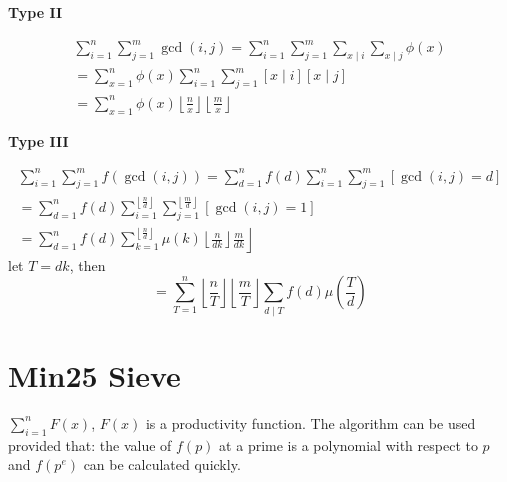 \textbf{Type II}
\begin{small}
\begin{equation}
	\begin{gathered}
	\sum_{i=1}^n \sum_{j=1}^m \operatorname{gcd}(i, j)=\sum_{i=1}^n \sum_{j=1}^m \sum_{x \mid i} \sum_{x \mid j} \phi(x) \\
	=\sum_{x=1}^n \phi(x) \sum_{i=1}^n \sum_{j=1}^m[x \mid i][x \mid j] \\
	=\sum_{x=1}^n \phi(x)\left\lfloor\frac{n}{x}\right\rfloor\left\lfloor\frac{m}{x}\right\rfloor
	\end{gathered}
	\end{equation}
\end{small}

\textbf{Type III}
\begin{small}
\begin{equation}
	\begin{gathered}
	\sum_{i=1}^n \sum_{j=1}^m f(\operatorname{gcd}(i, j))=\sum_{d=1}^n f(d) \sum_{i=1}^n \sum_{j=1}^m[\operatorname{gcd}(i, j)=d] \\
	=\sum_{d=1}^n f(d) \sum_{i=1}^{\left\lfloor\frac{n}{d}\right\rfloor} \sum_{j=1}^{\left\lfloor\frac{m}{d}\right\rfloor}[\operatorname{gcd}(i, j)=1] \\
	\left.=\sum_{d=1}^n f(d) \sum_{k=1}^{\left\lfloor\frac{n}{d}\right\rfloor} \mu(k)\left\lfloor\frac{n}{d k}\right\rfloor \frac{m}{d k}\right\rfloor
	\end{gathered}
	\end{equation}
	let $T=dk$, then
	\begin{equation}
		=\sum_{T=1}^n\left\lfloor\frac{n}{T}\right\rfloor\left\lfloor\frac{m}{T}\right\rfloor \sum_{d \mid T} f(d) \mu\left(\frac{T}{d}\right)
		\end{equation}
	\end{small}

 \section{Min25 Sieve}
 $\sum_{i=1}^{n} F(x)$, $F(x)$ is a productivity function. The algorithm can be used provided that: the value of $f(p)$ at a prime is a polynomial with respect to $p$ and $f\left(p^{e}\right)$ can be calculated quickly.
